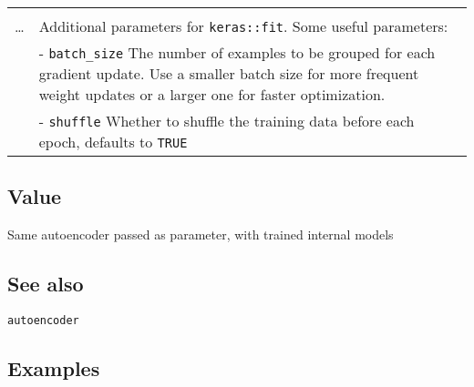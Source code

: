 \begin{longtable}[c]{@{}>{\small}p{3cm}>{\raggedright}p{12.5cm}@{}}
\begin{minipage}[t]{0.84\columnwidth}
\strut\end{minipage}\tabularnewline
\begin{minipage}[t]{0.09\columnwidth}\raggedright\strut
\ldots{}
\strut\end{minipage} &
\begin{minipage}[t]{0.84\columnwidth}\raggedright\strut
Additional parameters for \texttt{keras::fit}. Some useful parameters:
\strut\end{minipage}\tabularnewline
\begin{minipage}[t]{0.09\columnwidth}\raggedright\strut
\strut\end{minipage} &
\begin{minipage}[t]{0.84\columnwidth}\raggedright\strut
- \texttt{batch\_size} The number of examples to be grouped for each
gradient update. Use a smaller batch size for more frequent weight
updates or a larger one for faster optimization.
\strut\end{minipage}\tabularnewline
\begin{minipage}[t]{0.09\columnwidth}\raggedright\strut
\strut\end{minipage} &
\begin{minipage}[t]{0.84\columnwidth}\raggedright\strut
- \texttt{shuffle} Whether to shuffle the training data before each
epoch, defaults to \texttt{TRUE}
\strut\end{minipage}\tabularnewline
\bottomrule
\end{longtable}

\hypertarget{value}{\subsection{\texorpdfstring{\protect\hyperlink{value}{}Value}{Value}}\label{value}}

Same autoencoder passed as parameter, with trained internal models

\hypertarget{see-also}{\subsection{\texorpdfstring{\protect\hyperlink{see-also}{}See
also}{See also}}\label{see-also}}

\texttt{autoencoder}

\hypertarget{examples}{\subsection{\texorpdfstring{\protect\hyperlink{examples}{}Examples}{Examples}}\label{examples}}

